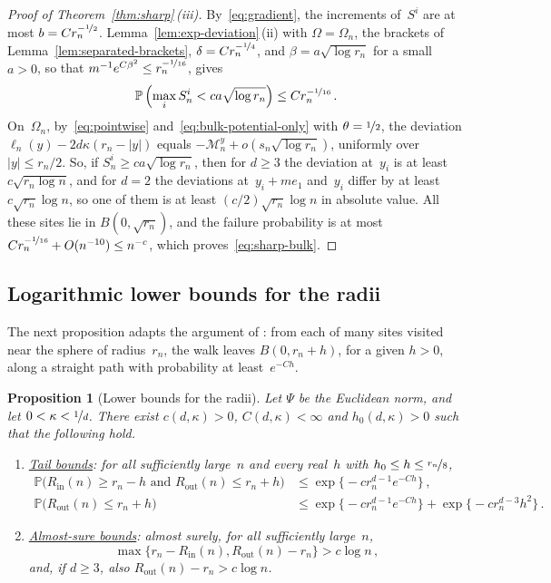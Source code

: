 \documentclass[11pt]{amsart}
\theoremstyle{plain}
\newtheorem{proposition}[theorem]{Proposition}
\theoremstyle{definition}
\renewcommand{\P}{\mathbb P}
\newcommand{\drift}{\kappa}
\newcommand{\gauge}{\Psi}
\newcommand{\nf}{\nicefrac}
\newcommand{\Rin}{R_{\mathrm{in}}}
\newcommand{\Rout}{R_{\mathrm{out}}}
\numberwithin{equation}{section}
\begin{document}
\begin{proof}[Proof of Theorem~\ref{thm:sharp}\,\textup{(iii)}]
By~\eqref{eq:gradient}, the increments of~$S^i$ are at most $b=Cr_n^{-\nf12}$. Lemma~\ref{lem:exp-deviation}\,(ii) with $\Omega=\Omega_n$, the brackets of Lemma~\ref{lem:separated-brackets}, $\delta=Cr_n^{-\nf14}$, and $\beta=a\sqrt{\log r_n}$ for a small $a>0$, so that $m^{-1}e^{C\beta^2}\leq r_n^{-\nf1{16}}$, gives
\begin{equation*}
\P\left(\max_iS^i_n<ca\sqrt{\log r_n}\right)\leq Cr_n^{-\nf1{16}}\, .
\end{equation*}
On~$\Omega_n$, by~\eqref{eq:pointwise} and~\eqref{eq:bulk-potential-only} with $\theta=\nf12$, the deviation $\ell_n(y)-2d\drift(r_n-|y|)$ equals $-\mathcal M_n^y+o(s_n\sqrt{\log r_n})$, uniformly over $|y|\leq r_n/2$. So, if $S^i_n\geq ca\sqrt{\log r_n}$, then for $d\geq3$ the deviation at~$y_i$ is at least $c\sqrt{r_n\log n}$, and for $d=2$ the deviations at~$y_i+me_1$ and~$y_i$ differ by at least $c\sqrt{r_n}\log n$, so one of them is at least $(c/2)\sqrt{r_n}\log n$ in absolute value. All these sites lie in $B(0,\sqrt{r_n})$, and the failure probability is at most $Cr_n^{-\nf1{16}}+O(n^{-10})\leq n^{-c}$, which proves~\eqref{eq:sharp-bulk}.
\end{proof}

\subsection{Logarithmic lower bounds for the radii}

The next proposition adapts the argument of \citet[Section~3]{AsselahGaudilliere2014}: from each of many sites visited near the sphere of radius~$r_n$, the walk leaves $B(0,r_n+h)$, for a given $h>0$, along a straight path with probability at least~$e^{-Ch}$.

\begin{proposition}[Lower bounds for the radii]\label{prop:log-lower}
Let $\gauge$ be the Euclidean norm, and let $0<\drift<\nf1d$. There exist $c(d,\drift)>0$, $C(d,\drift)<\infty$ and $h_0(d,\drift)>0$ such that the following hold.
\begin{enumerate}[label=\textup{(\roman*)}]
\item \underline{\emph{Tail bounds}}: for all sufficiently large~$n$ and every real~$h$ with $h_0\leq h\leq\nf{r_n}{8}$,
\begin{align}
\P\bigl(\Rin(n)\geq r_n-h\text{ and }\Rout(n)\leq r_n+h\bigr)&\leq\exp\bigl\{-cr_n^{d-1}e^{-Ch}\bigr\}\, ,\label{eq:log-lower-tail}\\
\P\bigl(\Rout(n)\leq r_n+h\bigr)&\leq\exp\bigl\{-cr_n^{d-1}e^{-Ch}\bigr\}+\exp\bigl\{-cr_n^{d-3}h^2\bigr\}\, .\label{eq:outer-lower-tail}
\end{align}
\item \underline{\emph{Almost-sure bounds}}: almost surely, for all sufficiently large~$n$,
\begin{equation}\label{eq:log-lower-as}
\max\{r_n-\Rin(n),\Rout(n)-r_n\}>c\log n\, ,
\end{equation}
and, if $d\geq3$, also $\Rout(n)-r_n>c\log n$.
\end{enumerate}
\end{proposition}
\end{document}
